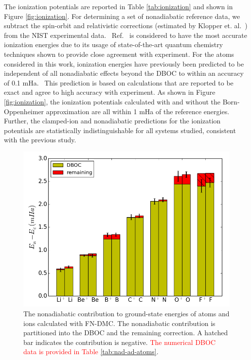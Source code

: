 \documentclass[aip,jcp,numerical,reprint]{revtex4-1}
\begin{document}
The ionization potentials are reported in Table \ref{tab:ionization} and shown in Figure \ref{fig:ionization}. For determining a set of nonadiabatic reference data, we subtract the spin-orbit and relativistic corrections (estimated by Klopper et. al.~\cite{Klopper_IP}) from the NIST experimental data.~\cite{NIST_Atoms} Ref.~\cite{Klopper_IP} is considered to have the most accurate ionization energies due to its usage of state-of-the-art quantum chemistry techniques shown to provide close agreement with experiment.
For the atoms considered in this work, ionization energies have previously been predicted to be independent of all nonadiabatic effects beyond the DBOC to within an accuracy of 0.1 mHa.~\cite{Klopper_IP} This prediction is based on calculations that are reported to be exact and agree to high accuracy with experiment. As shown in Figure \ref{fig:ionization}, the ionization potentials calculated with and without the Born-Oppenheimer approximation are all within 1 mHa of the reference energies. Further, the clamped-ion and nonadiabatic predictions for the ionization potentials are statistically indistinguishable for all systems studied, consistent with the previous study.~\cite{Klopper_IP}

\begin{figure}[h]
\includegraphics[scale=.4]{atom-nad-ad}
\caption{The nonadiabatic contribution to ground-state energies of atoms and ions calculated with FN-DMC. The nonadiabatic contribution is partitioned into the DBOC and the remaining correction. A hatched bar indicates the contribution is negative. \textcolor{red}{The numerical DBOC data is provided in Table \ref{tab:nad-ad-atoms}}. \label{fig:atom-nad-ad}} %
\end{figure}
\end{document}
